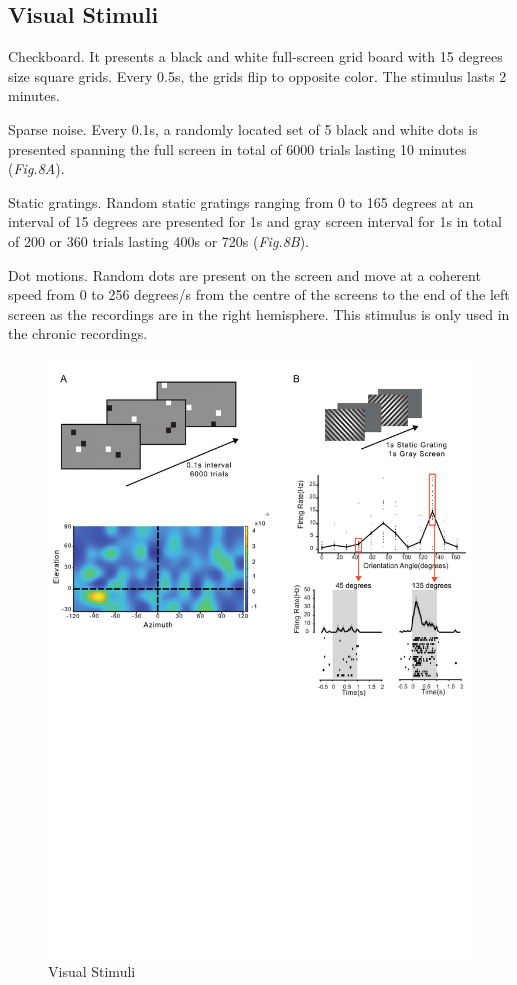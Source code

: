 \subsection{Visual Stimuli}
Checkboard. It presents a black and white full-screen grid board with 15 degrees size square grids. Every 0.5s, the grids flip to opposite color. The stimulus lasts 2 minutes.

Sparse noise. Every 0.1s, a randomly located set of 5 black and white dots is presented spanning the full screen in total of 6000 trials lasting 10 minutes (\textit{Fig.8A}).

Static gratings. Random static gratings ranging from 0 to 165 degrees at an interval of 15 degrees are presented for 1s and gray screen interval for 1s in total of 200 or 360 trials lasting 400s or 720s (\textit{Fig.8B}).

Dot motions. Random dots are present on the screen and move at a coherent speed from 0 to 256 degrees/s from the centre of the screens to the end of the left screen as the recordings are in the right hemisphere. This stimulus is only used in the chronic recordings.

\begin{figure}
    \centering
    \includegraphics[width=1\linewidth]{figures//Chapter 2//Thesis Figures/fig4_RF_and_gratings.pdf}
    \caption{Visual Stimuli}
    \label{fig:placeholder}
\end{figure}

